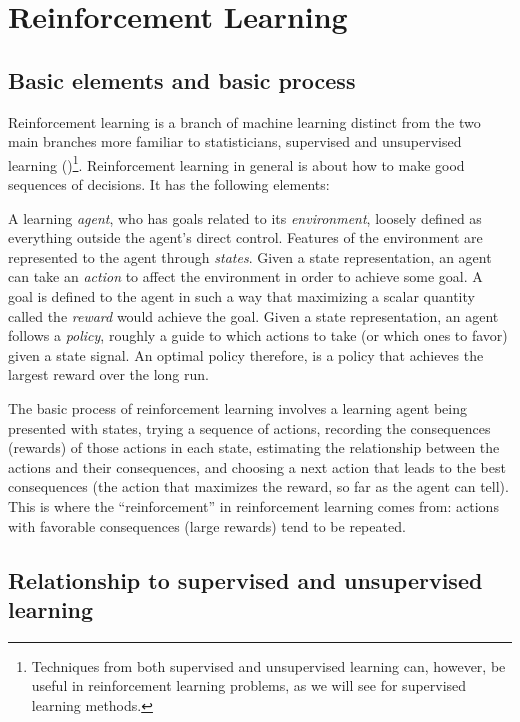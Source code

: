 \documentclass[12pt]{article}
\begin{document}

\section{Reinforcement Learning} %
\label{sec:reinforcement_learning}

\subsection{Basic elements and basic process} %
\label{sub:basic_process}

Reinforcement learning is a branch of machine learning distinct from the two main branches more familiar to statisticians, supervised and unsupervised learning (\cite{Sutton2016})\footnote{Techniques from both supervised and unsupervised learning can, however, be useful in reinforcement learning problems, as we will see for supervised learning methods.}. Reinforcement learning in general is about how to make good sequences of decisions. It has the following elements:

A learning \emph{agent}, who has goals related to its \emph{environment}, loosely defined as everything outside the agent's direct control. Features of the environment are represented to the agent through \emph{states}. Given a state representation, an agent can take an \emph{action} to affect the environment in order to achieve some goal. A goal is defined to the agent in such a way that maximizing a scalar quantity called the \emph{reward} would achieve the goal. Given a state representation, an agent follows a \emph{policy}, roughly a guide to which actions to take (or which ones to favor) given a state signal. An optimal policy therefore, is a policy that achieves the largest reward over the long run.

The basic process of reinforcement learning involves a learning agent being presented with states, trying a sequence of actions, recording the consequences (rewards) of those actions in each state, estimating the relationship between the actions and their consequences, and choosing a next action that leads to the best consequences (the action that maximizes the reward, so far as the agent can tell). This is where the ``reinforcement'' in reinforcement learning comes from: actions with favorable consequences (large rewards) tend to be repeated.


\subsection{Relationship to supervised and unsupervised learning} %
\label{sub:relationship_to_supervise_and_unsupervised_learning}
\end{document}
